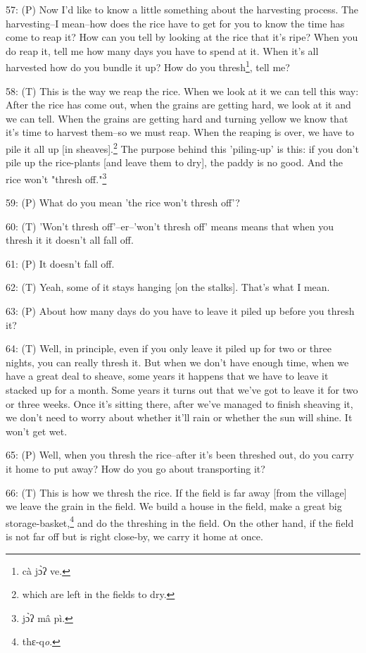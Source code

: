 57: (P) Now I'd like to know a little something about the harvesting process. The
harvesting--I mean--how does the rice have to get for you to know the time has
come to reap it? How can you tell by looking at the rice that it's ripe? When you
do reap it, tell me how many days you have to spend at it. When it's all harvested
how do you bundle it up? How do you thresh\footnote{cà jɔ̀ʔ ve.}, tell me?

58: (T) This is the way we reap the rice. When we look at it we can tell this way:
After the rice has come out, when the grains are getting hard, we look at it and
we can tell. When the grains are getting hard and turning yellow we know that it's
time to harvest them--so we must reap. When the reaping is over, we have to pile
it all up [in sheaves].\footnote{which are left in the fields to dry.} The purpose behind this 'piling-up' is this: if you
don't pile up the rice-plants [and leave them to dry], the paddy is no good. And
the rice won't "thresh off."\footnote{jɔ̀ʔ mâ pì.}

59: (P) What do you mean 'the rice won't thresh off'?

60: (T) 'Won't thresh off'--er--'won't thresh off' means means that when you thresh
it it doesn't all fall off.

61: (P) It doesn't fall off.

62: (T) Yeah, some of it stays hanging [on the stalks]. That's what I mean.

63: (P) About how many days do you have to leave it piled up before you thresh
it?

64: (T) Well, in principle, even if you only leave it piled up for two or three
nights, you can really thresh it. But when we don't have enough time, when we have
a great deal to sheave, some years it happens that we have to leave it stacked
up for a month. Some years it turns out that we've got to leave it for two or three
weeks. Once it's sitting there, after we've managed to finish sheaving it, we don't
need to worry about whether it'll rain or whether the sun will shine. It won't
get wet.

65: (P) Well, when you thresh the rice--after it's been threshed out, do you carry
it home to put away? How do you go about transporting it?

66: (T) This is how we thresh the rice. If the field is far away [from the village]
we leave the grain in the field. We build a house in the field, make a great big
storage-basket,\footnote{thɛ-q\emph{o}.} and do the threshing in the field. On the other hand, if the
field is not far off but is right close-by, we carry it home at once.

